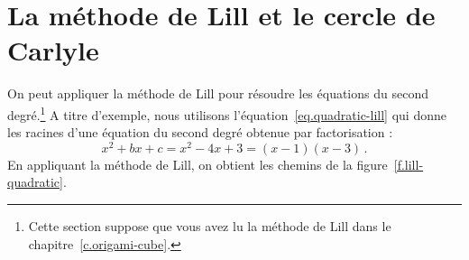 
\section{La méthode de Lill et le cercle de Carlyle}\label{s.lill-quadratic}

On peut appliquer la méthode de Lill pour résoudre les équations du second degré.\footnote{Cette section suppose que vous avez lu la méthode de Lill dans le chapitre~\ref{c.origami-cube}.} A titre d'exemple, nous utilisons l'équation~\ref{eq.quadratic-lill} qui donne les racines d'une équation du second degré obtenue par factorisation :
\[
x^2+bx+c=x^2-4x+3= (x-1)(x-3)\,.
\]
En appliquant la méthode de Lill, on obtient les chemins de  la figure~\ref{f.lill-quadratic}.

